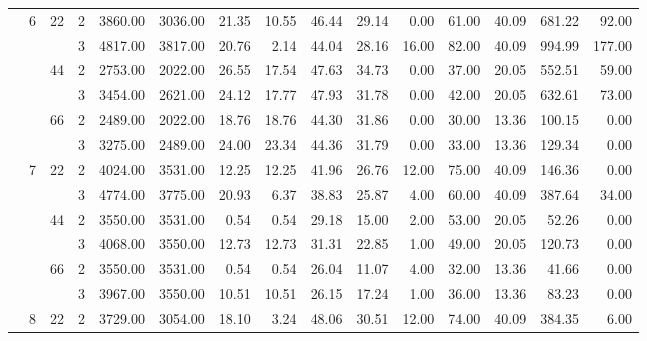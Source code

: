 \begin{tabular}{llllrrrrrrrrrrr}
\cline{2-15}
\cline{3-15}
               & \multirow{6}{*}{6} & \multirow{2}{*}{22} & 2 &  3860.00 &   3036.00 & 21.35 &   10.55 &   46.44 &   29.14 &    0.00 &   61.00 &   40.09 &  681.22 &    92.00 \\
               &   &    & 3 &  4817.00 &   3817.00 & 20.76 &    2.14 &   44.04 &   28.16 &   16.00 &   82.00 &   40.09 &  994.99 &   177.00 \\
\cline{3-15}
               &   & \multirow{2}{*}{44} & 2 &  2753.00 &   2022.00 & 26.55 &   17.54 &   47.63 &   34.73 &    0.00 &   37.00 &   20.05 &  552.51 &    59.00 \\
               &   &    & 3 &  3454.00 &   2621.00 & 24.12 &   17.77 &   47.93 &   31.78 &    0.00 &   42.00 &   20.05 &  632.61 &    73.00 \\
\cline{3-15}
               &   & \multirow{2}{*}{66} & 2 &  2489.00 &   2022.00 & 18.76 &   18.76 &   44.30 &   31.86 &    0.00 &   30.00 &   13.36 &  100.15 &     0.00 \\
               &   &    & 3 &  3275.00 &   2489.00 & 24.00 &   23.34 &   44.36 &   31.79 &    0.00 &   33.00 &   13.36 &  129.34 &     0.00 \\
\cline{2-15}
\cline{3-15}
               & \multirow{6}{*}{7} & \multirow{2}{*}{22} & 2 &  4024.00 &   3531.00 & 12.25 &   12.25 &   41.96 &   26.76 &   12.00 &   75.00 &   40.09 &  146.36 &     0.00 \\
               &   &    & 3 &  4774.00 &   3775.00 & 20.93 &    6.37 &   38.83 &   25.87 &    4.00 &   60.00 &   40.09 &  387.64 &    34.00 \\
\cline{3-15}
               &   & \multirow{2}{*}{44} & 2 &  3550.00 &   3531.00 &  0.54 &    0.54 &   29.18 &   15.00 &    2.00 &   53.00 &   20.05 &   52.26 &     0.00 \\
               &   &    & 3 &  4068.00 &   3550.00 & 12.73 &   12.73 &   31.31 &   22.85 &    1.00 &   49.00 &   20.05 &  120.73 &     0.00 \\
\cline{3-15}
               &   & \multirow{2}{*}{66} & 2 &  3550.00 &   3531.00 &  0.54 &    0.54 &   26.04 &   11.07 &    4.00 &   32.00 &   13.36 &   41.66 &     0.00 \\
               &   &    & 3 &  3967.00 &   3550.00 & 10.51 &   10.51 &   26.15 &   17.24 &    1.00 &   36.00 &   13.36 &   83.23 &     0.00 \\
\cline{2-15}
\cline{3-15}
               & \multirow{6}{*}{8} & \multirow{2}{*}{22} & 2 &  3729.00 &   3054.00 & 18.10 &    3.24 &   48.06 &   30.51 &   12.00 &   74.00 &   40.09 &  384.35 &     6.00 \\

\end{tabular}
